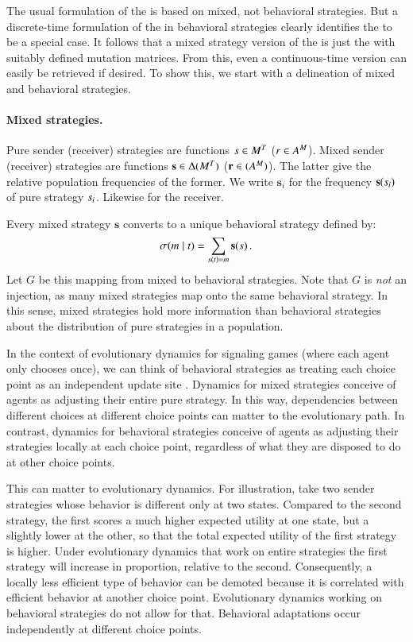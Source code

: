 \documentclass[fleqn,reqno,10pt]{article}
\renewcommand{\Smixed}{\ensuremath{\mathrm{\mathbf{s}}}}
\renewcommand{\Rmixed}{\ensuremath{\mathrm{\mathbf{r}}}}
\newcommand{\rmd}{\acro{rmd}} %
\newcommand{\rdd}{\acro{rdd}} %
\begin{document}
The usual formulation of the \rmd is based on mixed, not behavioral
strategies. But a discrete-time formulation of the \rmd in behavioral
strategies clearly identifies the \rdd to be a special case. It
follows that a mixed strategy version of the \rdd is just the \rmd
with suitably defined mutation matrices. From this, even a
continuous-time version can easily be retrieved if desired. To show
this, we start with a delineation of mixed and behavioral strategies.

\paragraph{Mixed strategies.} Pure sender (receiver) strategies are
functions $s \in M^T$ ($r \in
A^M$). Mixed sender (receiver) strategies are functions
$\Smixed \in \Delta(\Messgs^\States)$ ($\Rmixed \in
(\Acts^\Messgs)$). The latter give the relative population frequencies
of the former. We write $\Smixed_i$ for the frequency
$\Smixed(\Spure_i)$ of pure strategy $s_i$. Likewise for the
receiver.

Every mixed strategy $\Smixed$ converts to a unique behavioral
strategy defined by:
\begin{align}
  \label{eq:CorrespondenceBehavioralMixed}
  \Sstrat(\messg \probbar \state) = \sum_{\Spure(\state) = \messg} \Smixed(\Spure)\,.
\end{align} 
Let $G$ be this mapping from mixed to behavioral strategies. Note that $G$
is \emph{not} an injection, as many mixed strategies map onto the same
behavioral strategy. In this sense, mixed strategies hold more
information than behavioral strategies about the distribution of pure strategies in a population.

In the context of evolutionary dynamics for signaling games (where
each agent only chooses once), we can think of behavioral strategies
as treating each choice point as an independent update site
\citep[e.g.][]{Cressman2003:Evolutionary-Dy}. Dynamics for mixed
strategies conceive of agents as adjusting their entire pure
strategy. In this way, dependencies between different choices at
different choice points can matter to the evolutionary path. In
contrast, dynamics for behavioral strategies conceive of agents as
adjusting their strategies locally at each choice point, regardless of
what they are disposed to do at other choice points.

This can matter to evolutionary dynamics. For illustration, take two
sender strategies whose behavior is different only at two
states. Compared to the second strategy, the first scores a much
higher expected utility at one state, but a slightly lower at the
other, so that the total expected utility of the first strategy is
higher. Under evolutionary dynamics that work on entire strategies the
first strategy will increase in proportion, relative to the
second. Consequently, a locally less efficient type of behavior can be
demoted because it is correlated with efficient behavior at another
choice point. Evolutionary dynamics working on behavioral strategies
do not allow for that. Behavioral adaptations occur independently at
different choice points.
\end{document}
